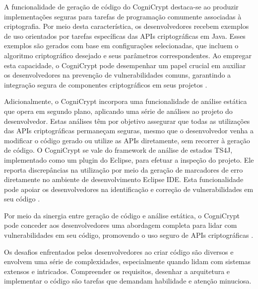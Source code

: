 A funcionalidade de geração de código do CogniCrypt destaca-se ao produzir implementações seguras para tarefas de programação comumente associadas à criptografia. Por meio desta característica, os desenvolvedores recebem exemplos de uso orientados por tarefas específicas das APIs criptográficas em Java. Esses exemplos são gerados com base em configurações selecionadas, que incluem o algoritmo criptográfico desejado e seus parâmetros correspondentes. Ao empregar esta capacidade, o CogniCrypt pode desempenhar um papel crucial em auxiliar os desenvolvedores na prevenção de vulnerabilidades comuns, garantindo a integração segura de componentes criptográficos em seus projetos \cite{CogniCrypt}.

Adicionalmente, o CogniCrypt incorpora uma funcionalidade de análise estática que opera em segundo plano, aplicando uma série de análises ao projeto do desenvolvedor. Estas análises têm por objetivo assegurar que todas as utilizações das APIs criptográficas permaneçam seguras, mesmo que o desenvolvedor venha a modificar o código gerado ou utilize as APIs diretamente, sem recorrer à geração de código. O CogniCrypt se vale do framework de análise de estados TS4J, implementado como um plugin do Eclipse, para efetuar a inspeção do projeto. Ele reporta discrepâncias na utilização por meio da geração de marcadores de erro diretamente no ambiente de desenvolvimento Eclipse IDE. Esta funcionalidade pode apoiar os desenvolvedores na identificação e correção de vulnerabilidades em seu código \cite{CogniCrypt}.

Por meio da sinergia entre geração de código e análise estática, o CogniCrypt pode conceder aos desenvolvedores uma abordagem completa para lidar com vulnerabilidades em seu código, promovendo o uso seguro de APIs criptográficas \cite{CogniCrypt}.


Os desafios enfrentados pelos desenvolvedores ao criar código são diversos e envolvem uma série de complexidades, especialmente quando lidam com sistemas extensos e intricados. Compreender os requisitos, desenhar a arquitetura e implementar o código são tarefas que demandam habilidade e atenção minuciosa. \cite{CogniCrypt}

